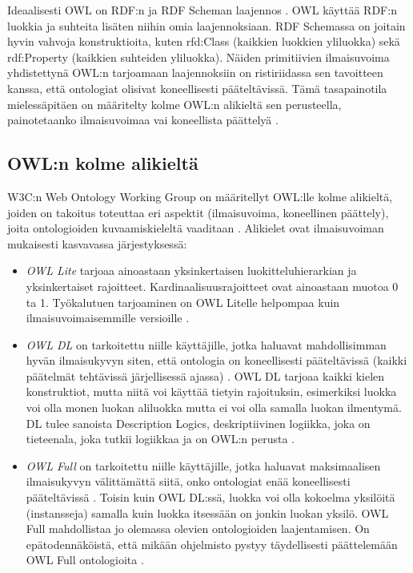 \documentclass[finnish]{tktltiki2}
\theoremstyle{definition}
\theoremstyle{remark}
\begin{document}
Ideaalisesti OWL on RDF:n ja RDF Scheman laajennos \cite{AH09}. OWL käyttää
RDF:n luokkia ja suhteita lisäten niihin omia laajennoksiaan. RDF Schemassa on joitain 
hyvin vahvoja konstruktioita, kuten rfd:Class
(kaikkien luokkien yliluokka) sekä rdf:Property (kaikkien suhteiden yliluokka).
Näiden primitiivien ilmaisuvoima yhdistettynä OWL:n tarjoamaan laajennoksiin
on ristiriidassa sen tavoitteen kanssa, että ontologiat olisivat koneellisesti
pääteltävissä. Tämä tasapainotila mielessäpitäen on määritelty kolme OWL:n
alikieltä sen perusteella, painotetaanko ilmaisuvoimaa vai koneellista päättelyä
\cite{AH09}.  

\subsection{OWL:n kolme alikieltä}

W3C:n Web Ontology Working Group on määritellyt OWL:lle kolme alikieltä, joiden
on takoitus toteuttaa eri aspektit (ilmaisuvoima, koneellinen päättely), joita
ontologioiden kuvaamiskieleltä vaaditaan \cite{MH04}. Alikielet ovat ilmaisuvoiman mukaisesti
kasvavassa järjestyksessä:

\begin{itemize}
 \item \textit{OWL Lite} tarjoaa ainoastaan yksinkertaisen luokitteluhierarkian ja yksinkertaiset rajoitteet\cite{MH04}. Kardinaalisuusrajoitteet ovat ainoastaan muotoa 0 ta 1. Työkalutuen tarjoaminen on OWL Litelle helpompaa kuin ilmaisuvoimaisemmille versioille \cite{MH04}.  
 \item \textit{OWL DL} on tarkoitettu niille käyttäjille, jotka haluavat mahdollisimman hyvän ilmaisukyvyn siten, että ontologia on koneellisesti pääteltävissä (kaikki päätelmät tehtävissä järjellisessä ajassa) \cite{MH04}. OWL DL tarjoaa kaikki kielen konstruktiot, mutta niitä voi käyttää tietyin rajoituksin, esimerkiksi luokka voi olla monen luokan aliluokka mutta ei voi olla samalla luokan ilmentymä. DL tulee sanoista Description Logics, deskriptiivinen logiikka, joka on tieteenala, joka tutkii logiikkaa ja on OWL:n perusta \cite{MH04}.  
 \item \textit{OWL Full} on tarkoitettu niille käyttäjille, jotka haluavat maksimaalisen ilmaisukyvyn välittämättä siitä, onko ontologiat enää koneellisesti pääteltävissä \cite{MH04}. Toisin kuin OWL DL:ssä, luokka voi olla kokoelma yksilöitä (instansseja) samalla kuin luokka itsessään on jonkin luokan yksilö. OWL Full mahdollistaa jo olemassa olevien ontologioiden laajentamisen. On epätodennäköistä, että mikään ohjelmisto pystyy täydellisesti päättelemään OWL Full ontologioita \cite{MH04}. 
\end{itemize}
\end{document}
